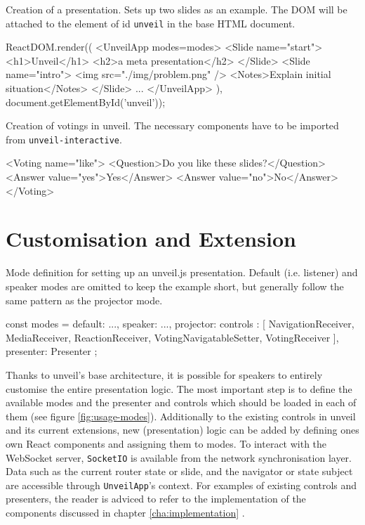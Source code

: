 \begin{program}
\caption{Creation of a presentation. Sets up two slides as an example. The DOM will be attached to the element of id \texttt{unveil} in the base HTML document.}
\label{prog:usage-presentation-creation}
\begin{JsCode}
ReactDOM.render((
  <UnveilApp modes={modes}>
    <Slide name="start">
      <h1>Unveil</h1>
      <h2>a meta presentation</h2>
    </Slide>
    <Slide name="intro">
      <img src="./img/problem.png" />
      <Notes>Explain initial situation</Notes>
    </Slide>
    ...
  </UnveilApp>
), document.getElementById('unveil'));
\end{JsCode}
\end{program}


\begin{program}
\caption{Creation of votings in unveil. The necessary components have to be imported from \texttt{unveil-interactive}.}
\label{prog:usage-voting}
\begin{JsCode}
<Voting name="like">
  <Question>Do you like these slides?</Question>
  <Answer value="yes">Yes</Answer>
  <Answer value="no">No</Answer>
</Voting>
\end{JsCode}
\end{program}

\section{Customisation and Extension}
\label{sec:usage-customisation}

\begin{program}
\caption{Mode definition for setting up an unveil.js presentation. Default (i.e. listener) and speaker modes are omitted to keep the example short, but generally follow the same pattern as the projector mode.}
\label{fig:usage-modes}
\begin{JsCode}
const modes = {
  default: {...},
  speaker: {...},
  projector: {
    controls : [
      NavigationReceiver, MediaReceiver, ReactionReceiver,
      VotingNavigatableSetter, VotingReceiver
    ],
    presenter: Presenter
  }
};
\end{JsCode}
\end{program}

Thanks to unveil's base architecture, it is possible for speakers to entirely customise the entire presentation logic. The most important step is to define the available modes and the presenter and controls which should be loaded in each of them (see figure \ref{fig:usage-modes}). Additionally to the existing controls in unveil and its current extensions, new (presentation) logic can be added by defining ones own React components and assigning them to modes. To interact with the WebSocket server, \texttt{SocketIO} is available from the network synchronisation layer. Data such as the current router state or slide, and the navigator or state subject are accessible through \texttt{UnveilApp}'s context. For examples of existing controls and presenters, the reader is adviced to refer to the implementation of the components discussed in chapter \ref{cha:implementation} \cite{unveil-fork, unveil-network-sync, unveil-interactive}.

